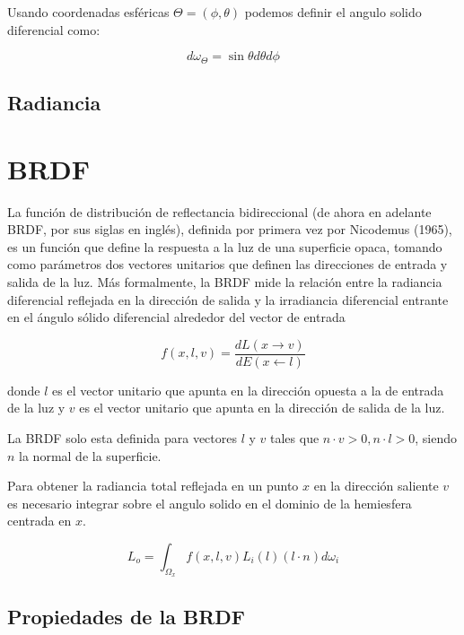 Usando coordenadas esféricas $\Theta = (\phi , \theta )$ podemos definir el angulo solido diferencial como:

\begin{equation}
d \omega _ \Theta = \sin \theta d \theta d \phi
\end{equation}

\subsection{Radiancia}



\clearpage

\section{BRDF}

La función de distribución de reflectancia bidireccional (de ahora en adelante BRDF, por sus siglas en inglés), definida por primera vez por \cite{Nicodemus1965} Nicodemus (1965), es un función que define la respuesta a la luz de una superficie opaca, tomando como parámetros dos vectores unitarios que definen las direcciones de entrada y salida de la luz. Más formalmente, la BRDF mide la relación entre la radiancia diferencial reflejada en la dirección de salida y la irradiancia diferencial entrante en el ángulo sólido diferencial alrededor del vector de entrada

\begin{equation}
f(x, l, v)=\frac{dL(x \to v)}{dE(x \gets l)} 
\end{equation}

donde $l$ es el vector unitario que apunta en la dirección opuesta a la de entrada de la luz y $v$ es el vector unitario que apunta en la dirección de salida de la luz.

La BRDF solo esta definida para vectores $l$ y $v$ tales que $n \cdot v > 0, n \cdot l > 0$, siendo $n$ la normal de la superficie.
\newline

Para obtener la radiancia total reflejada en un punto $x$ en la dirección saliente $v$ es necesario integrar sobre el angulo solido en el dominio de la hemiesfera centrada en $x$.

\begin{equation}
L _ o = \int_{\Omega_x} f(x, l, v) L_i(l) (l \cdot n) d\omega_i 
\end{equation}

\subsection{Propiedades de la BRDF}


